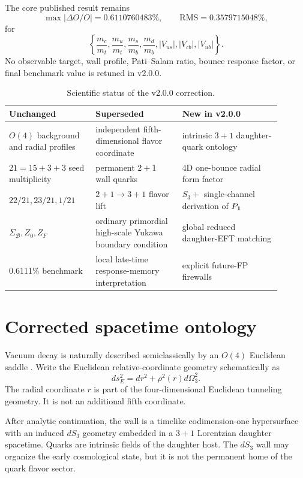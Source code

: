 \documentclass[11pt]{article}
\begin{document}
The core published result remains
\begin{equation}
\max |\Delta O/O|=0.6110760483\%,\qquad
\mathrm{RMS}=0.3579715048\%,
\end{equation}
for
\begin{equation}
\left\{\frac{m_c}{m_t},\frac{m_u}{m_t},\frac{m_s}{m_b},\frac{m_d}{m_b},|V_{us}|,|V_{cb}|,|V_{ub}|\right\}.
\end{equation}
No observable target, wall profile, Pati--Salam ratio, bounce response factor, or final benchmark value is retuned in v2.0.0.

\begin{table}[h]
\centering
\begin{tabular}{p{0.29\linewidth}p{0.29\linewidth}p{0.32\linewidth}}
\toprule
\textbf{Unchanged} & \textbf{Superseded} & \textbf{New in v2.0.0}\\
\midrule
$O(4)$ background and radial profiles & independent fifth-dimensional flavor coordinate & intrinsic $3+1$ daughter-quark ontology\\
$21=15+3+3$ seed multiplicity & permanent $2+1$ wall quarks & 4D one-bounce radial form factor\\
$22/21,23/21,1/21$ & $2+1\to3+1$ flavor lift & $S_3+$ single-channel derivation of $P_{\bf1}$\\
$\Sigma_{\mathcal B},Z_0,Z_F$ & ordinary primordial high-scale Yukawa boundary condition & global reduced daughter-EFT matching\\
0.6111\% benchmark & local late-time response-memory interpretation & explicit future-FP firewalls\\
\bottomrule
\end{tabular}
\caption{Scientific status of the v2.0.0 correction.}
\end{table}

\section{Corrected spacetime ontology}
Vacuum decay is naturally described semiclassically by an $O(4)$ Euclidean saddle \cite{Coleman1977,CallanColeman1977}. Write the Euclidean relative-coordinate geometry schematically as
\begin{equation}
 ds_E^2=dr^2+\rho^2(r)d\Omega_3^2.
\end{equation}
The radial coordinate $r$ is part of the four-dimensional Euclidean tunneling geometry. It is not an additional fifth coordinate.

After analytic continuation, the wall is a timelike codimension-one hypersurface with an induced $dS_3$ geometry embedded in a $3+1$ Lorentzian daughter spacetime. Quarks are intrinsic fields of the daughter host. The $dS_3$ wall may organize the early cosmological state, but it is not the permanent home of the quark flavor sector.
\end{document}
